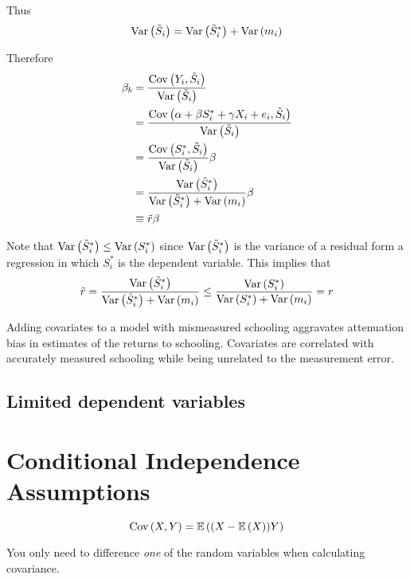 \documentclass[11pt]{article}
\begin{document}
Thus
\begin{equation}
	\text{Var}\left( \tilde{S}_i \right) = \text{Var}\left( \tilde{S}^*_i \right) + \text{Var}\left( m_i \right)
\end{equation}

Therefore 
\begin{align*}
	\beta_b &= \frac{\text{Cov}\left( Y_i, \tilde{S}_i \right)}{\text{Var}\left( \tilde{S}_i \right)} \\
	&= \frac{\text{Cov}\left( \alpha + \beta S_i^* + \gamma X_i + e_i, \tilde{S}_i \right)}{\text{Var}\left( \tilde{S}_i \right)} \\
	&= \frac{\text{Cov}\left( S_i^*,\tilde{S}_i \right)}{\text{Var}\left( \tilde{S}_i \right)}  \beta \\
	&= \frac{\text{Var}\left( \tilde{S}_i^* \right)}{\text{Var}\left( \tilde{S}^*_i \right) + \text{Var}\left( m_i \right)} \beta \\
	&\equiv \tilde{r} \beta
\end{align*}

Note that $\text{Var}\left( \tilde{S}_i^* \right) \leq \text{Var}\left( S_i^* \right)$ since $\text{Var}\left( \tilde{S}_i^* \right)$ is the variance of a residual form a regression in which $S_i^*$ is the dependent variable. This implies that
\begin{equation}
	\tilde{r} = \frac{\text{Var}\left( \tilde{S}_i^* \right)}{\text{Var}\left( \tilde{S}^*_i \right) + \text{Var}\left( m_i \right)} \leq \frac{\text{Var}\left( S_i^* \right)}{\text{Var}\left( S^*_i \right) + \text{Var}\left( m_i \right)} = r
\end{equation}

\begin{interpretation}
	Adding covariates to a model with mismeasured schooling aggravates attenuation bias in estimates of the returns to schooling. Covariates are correlated with accurately measured schooling while being unrelated to the measurement error. 
\end{interpretation}


\subsection{Limited dependent variables}


\section{Conditional Independence Assumptions}

\begin{claim}[]
	\begin{equation}
		\text{Cov}\left( X,Y \right) = \mathop{{}\mathbb{E}}\left( (X-\mathop{{}\mathbb{E}}\left( X \right))Y \right)
	\end{equation}
\end{claim}

\begin{interpretation}
	You only need to difference \emph{one} of the random variables when calculating covariance. 
\end{interpretation}
\end{document}
